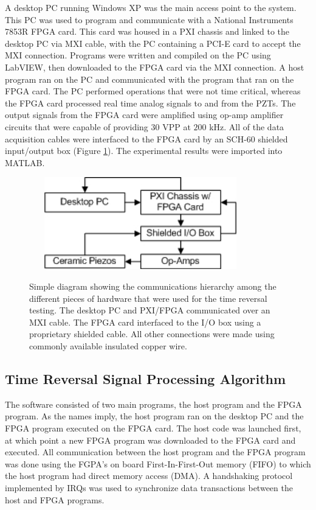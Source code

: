 \documentclass[11pt,letterpaper]{article}%
\begin{document}
A desktop PC running Windows XP was the main access point to the system. This PC was used to program and communicate with a National Instruments 7853R FPGA card. This card was housed in a PXI chassis and linked to the desktop PC via MXI cable, with the PC containing a PCI-E card to accept the MXI connection. Programs were written and compiled on the PC using LabVIEW, then downloaded to the FPGA card via the MXI connection. A host program ran on the PC and communicated with the program that ran on the FPGA card. The PC performed operations that were not time critical, whereas the FPGA card processed real time analog signals to and from the PZTs. The output signals from the FPGA card were amplified using op-amp amplifier circuits that were capable of providing $30$ VPP at $200$ kHz. All of the data acquisition cables were interfaced to the FPGA card by an SCH-60 shielded input/output box (Figure \ref{hardwareDiag}). The experimental results were imported into MATLAB.

\begin{figure}
\begin{center}
{\includegraphics[width=9.7cm,height=4cm]{hardwareComm.jpg}}
 \caption[comp1]
   { \label{hardwareDiag}
   Simple diagram showing the communications hierarchy among the different pieces of hardware that were used for the time reversal testing. The desktop PC and PXI/FPGA communicated over an MXI cable. The FPGA card interfaced to the I/O box using a proprietary shielded cable. All other connections were made using commonly available insulated copper wire.
 }
 \end{center}
 \end{figure}

\subsection{Time Reversal Signal Processing Algorithm}
\label{trAlgorithm}
The software consisted of two main programs, the host program and the FPGA program. As the names imply, the host program ran on the desktop PC and the FPGA program executed on the FPGA card. The host code was launched first, at which point a new FPGA program was downloaded to the FPGA card and executed. All communication between the host program and the FPGA program was done using the FGPA's on board First-In-First-Out memory (FIFO) to which the host program had direct memory access (DMA). A handshaking protocol implemented by IRQs was used to synchronize data transactions between the host and FPGA programs.
\end{document}
